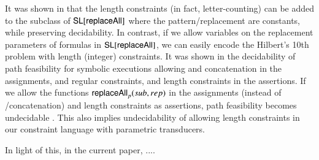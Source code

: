 It was shown in \cite{LB16} that the length constraints (in fact, letter-counting) can be
added to the subclass of $\mathsf{SL}[\mathsf{replaceAll}]$ where the pattern/replacement 
are constants, while preserving decidability. In contrast, if we allow 
variables on the replacement parameters of formulas in $\mathsf{SL}[\mathsf{replaceAll}]$,
we can easily encode the Hilbert's 10th problem with length (integer) 
constraints. 
%
%
%
%
It was shown in \cite{LB16} the decidability of path 
feasibility for symbolic
executions allowing \FT{} and concatenation in the 
assignments, and regular constraints, and length constraints 
in the assertions. If we allow the functions
$\mathsf{replaceAll}_p(sub,rep)$ in the assignments (instead of
\FT{}/concatenation) and length constraints as assertions, path
feasibility becomes undecidable \cite{CCHLW18}. This also implies undecidability
of allowing length constraints in our constraint language with parametric
transducers. 

In light of this, in the current paper, ....





